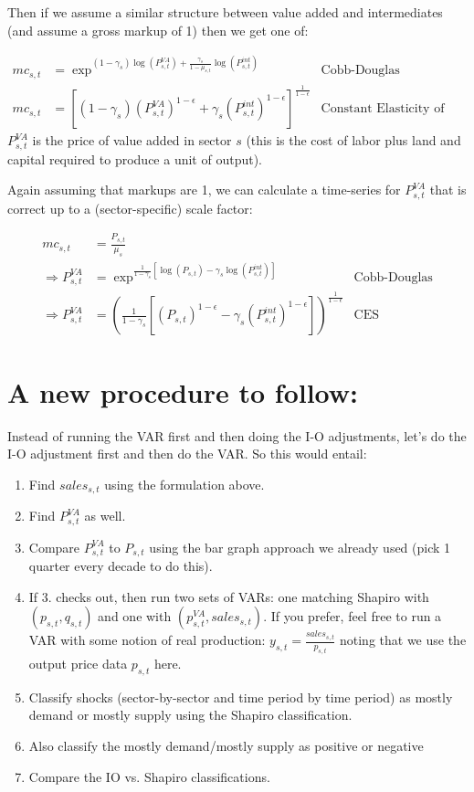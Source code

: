 \documentclass[12pt,english]{article}
\begin{document}
Then if we assume a similar structure between value added and intermediates (and assume a gross markup of 1) then we get one of:

\begin{align*}
	mc_{s,t}&=\exp^{(1-\gamma_s)\log(P_{s,t}^{VA})+\frac{\gamma_s}{1-\mu_{s,t}}\log(P_{s,t}^{int})} & \text{Cobb-Douglas Production}\\
mc_{s,t}&=\left[(1-\gamma_s)(P_{s,t}^{VA})^{1-\epsilon}+\gamma_s(P_{s,t}^{int})^{1-\epsilon}\right]^{\frac{1}{1-\epsilon}} & \text{Constant Elasticity of Substitution Production}	
\end{align*}
$P_{s,t}^{VA}$ is the price of value added in sector $s$ (this is the cost of labor plus land and capital required to produce a unit of output). 

Again assuming that markups are 1, we can calculate a time-series for $P_{s,t}^{VA}$ that is correct up to a (sector-specific) scale factor:

\begin{align*}
	mc_{s,t}&=\frac{P_{s,t}}{\mu_s}\\
	\Rightarrow P_{s,t}^{VA} &= \exp^{\frac{1}{1-\gamma_s}\left[\log(P_{s,t})-\gamma_s\log(P_{s,t}^{int})\right]}&\text{Cobb-Douglas}\\
	\Rightarrow P_{s,t}^{VA} &= \left(\frac{1}{1-\gamma_s}\left[\left(P_{s,t}\right)^{1-\epsilon}-\gamma_s(P_{s,t}^{int})^{1-\epsilon}\right]\right)^{\frac{1}{1-\epsilon}}&\text{CES}
\end{align*}

\section{A new procedure to follow:}

Instead of running the VAR first and then doing the I-O adjustments, let's do the I-O adjustment first and then do the VAR. So this would entail:

\begin{enumerate}
	\item Find $sales_{s,t}$ using the formulation above.
	\item Find $P_{s,t}^{VA}$ as well.
	\item Compare $P_{s,t}^{VA}$ to $P_{s,t}$ using the bar graph approach we already used (pick 1 quarter every decade to do this).
	\item If 3. checks out, then run two sets of VARs: one matching Shapiro with $(p_{s,t},q_{s,t})$ and one with $(p_{s,t}^{VA},sales_{s,t})$. If you prefer, feel free to run a VAR with some notion of real production: $y_{s,t}=\frac{sales_{s,t}}{p_{s,t}}$ noting that we use the output price data $p_{s,t}$ here.
	\item Classify shocks (sector-by-sector and time period by time period) as mostly demand or mostly supply using the Shapiro classification.
	\item Also classify the mostly demand/mostly supply as positive or negative
	\item Compare the IO vs. Shapiro classifications.
\end{enumerate}
\end{document}
